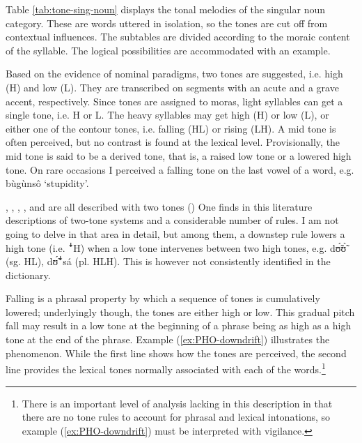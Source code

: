 Table \ref{tab:tone-sing-noun} displays  the tonal melodies of the singular noun category.  These are words uttered in isolation, so the tones are cut off from contextual influences. The subtables are divided according to the moraic content of the syllable. The  logical possibilities are accommodated with an example.



Based on the evidence of nominal paradigms,  two  tones are suggested, i.e. high (H) and low (L). They are transcribed on segments with an acute and a grave  accent, respectively. Since tones are assigned to moras, light syllables can get a single tone, i.e. H or L. The heavy syllables may get high (H) or low (L), or either one of the contour tones, i.e. falling (HL) or rising (LH). A mid tone is often perceived, but no contrast is found  at the lexical level. Provisionally,  the mid tone is said to be a derived tone, that is, a raised low tone  or a lowered high tone. On rare occasions I  perceived a falling tone on the last vowel of a word, e.g. {\sls  bùgùnsô} `stupidity'.


, ,  ,  ,  and   are all described with two tones (\citealt{Rowl65, Crou66, Gray69,  Toup95, Crou03})  One finds in this literature descriptions of two-tone systems and a considerable number of  rules. I am not going to delve in that area in detail, but among them,  a downstep rule lowers a high tone (i.e. {\T ꜜ}H)  when a low tone intervenes between two high tones, e.g. {\sls dʊ̃́ʊ̃̀} ({\sc sg.} HL), {\sls dʊ̃́{\T ꜜ}sá} ({\sc pl.} HLH).  This is however not consistently identified in the dictionary.



\largerpage[2]
Falling  is a phrasal property by which a sequence of tones is cumulatively lowered; underlyingly though, the tones are either high or low. This gradual pitch fall may result in a low tone at the beginning of a phrase being as high as a high tone at the end of the phrase. Example (\ref{ex:PHO-downdrift}) illustrates the phenomenon. While the first line shows how the tones are perceived, the second line provides the lexical  tones normally associated with each of the words.\footnote{There is an important level of analysis lacking in this description in that there are no tone rules to account for phrasal and lexical intonations, so example (\ref{ex:PHO-downdrift}) must be interpreted with vigilance.}

\newpage 

